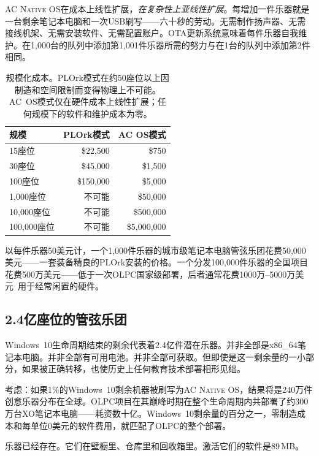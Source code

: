 \documentclass[10pt,letterpaper,twocolumn]{article}
\newcommand{\acos}{\textsc{AC Native OS}}
\begin{document}
\acos{}在成本上线性扩展，\emph{在复杂性上亚线性扩展}。每增加一件乐器就是一台剩余笔记本电脑和一次USB刷写——六十秒的劳动。无需制作扬声器、无需接线机架、无需安装软件、无需配置账户。OTA更新系统意味着每件乐器自我维护。在1,000台的队列中添加第1,001件乐器所需的努力与在1台的队列中添加第2件相同。

\begin{table}[h]
\small
\centering
\begin{tabular}{lrr}
\toprule
\textbf{规模} & \textbf{PLOrk模式} & \textbf{AC OS模式} \\
\midrule
15座位 & \$22,500 & \$750 \\
30座位 & \$45,000 & \$1,500 \\
100座位 & \$150,000 & \$5,000 \\
1,000座位 & 不可能 & \$50,000 \\
10,000座位 & 不可能 & \$500,000 \\
100,000座位 & 不可能 & \$5,000,000 \\
\bottomrule
\end{tabular}
\caption{规模化成本。PLOrk模式在约50座位以上因制造和空间限制而变得物理上不可能。AC~OS模式仅在硬件成本上线性扩展；任何规模下的软件和维护成本为零。}
\label{tab:scaling}
\end{table}

以每件乐器50美元计，一个1,000件乐器的城市级笔记本电脑管弦乐团花费50,000美元——一套装备精良的PLOrk安装的价格。一个分发100,000件乐器的全国项目花费500万美元——低于一次OLPC国家级部署，后者通常花费1000万--5000万美元~\citep{kraemer2009olpc}用于经常闲置的硬件。

\subsection{2.4亿座位的管弦乐团}

Windows~10生命周期结束的剩余代表着2.4亿件潜在乐器。并非全部是x86\_64笔记本电脑。并非全部有可用电池。并非全部可获取。但即使是这一剩余量的一小部分，如果被正确转移，也使历史上任何教育技术部署相形见绌。

考虑：如果1\%的Windows~10剩余机器被刷写为\acos{}，结果将是240万件创意乐器分布在全球。OLPC项目在其巅峰时期在整个生命周期内共部署了约300万台XO笔记本电脑——耗资数十亿。Windows~10剩余量的百分之一，零制造成本和每单位0美元的软件费用，就匹配了OLPC的整个部署。

乐器已经存在。它们在壁橱里、仓库里和回收箱里。激活它们的软件是89\,MB。

\end{document}
